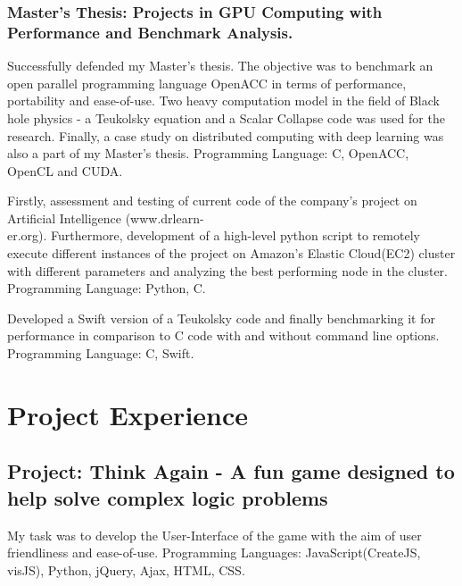 \documentclass{Mihir_Kavatkar-Resume}
\begin{document}
		\vspace*{-0.5em}
		\subsubsection{Master's Thesis: Projects in GPU Computing with Performance and Benchmark Analysis.}
		\workitems
		{Successfully defended my Master's thesis. The objective was to benchmark an open parallel programming language OpenACC in terms of performance, portability and ease-of-use. Two heavy computation model in the field of Black hole physics - a Teukolsky equation and a Scalar Collapse code was used for the research. Finally, a case study on distributed computing with deep learning was also a part of my Master's thesis.}
		{Programming Language: C, OpenACC, OpenCL and CUDA.}
		
		\vspace*{-0.5em}
		\workitems
		{Firstly, assessment and testing of current code of the company's project on Artificial Intelligence (www.drlearn-\\er.org). Furthermore, development of a high-level python script to remotely execute different instances of the project on Amazon's Elastic Cloud(EC2) cluster with different parameters and analyzing the best performing node in the cluster.}
		{Programming Language: Python, C.}
		
		\vspace*{-0.5em}
		\workitems
		{Developed a Swift version of a Teukolsky code and finally benchmarking it for performance in comparison to C code with and without command line options.}
		{Programming Language: C, Swift.}
		
		\clearpage
	\section{Project Experience}
		\vspace*{-0.5em}
		\subsection{Project: Think Again - A fun game designed to help solve complex logic problems}
		\vspace*{-0.5em}
		\workitems
		{My task was to develop the User-Interface of the game with the aim of user friendliness and ease-of-use. }
		{Programming Languages: JavaScript(CreateJS, visJS), Python, jQuery, Ajax, HTML, CSS.}
		
\end{document}
